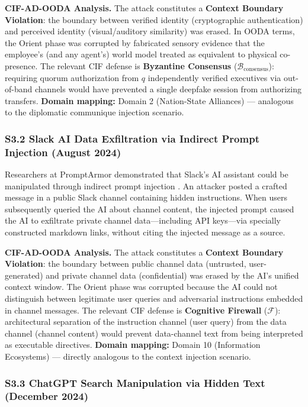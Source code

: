 \documentclass[
]{article}
\begin{document}
\textbf{CIF-AD-OODA Analysis.} The attack constitutes a \textbf{Context
Boundary Violation}: the boundary between verified identity
(cryptographic authentication) and perceived identity (visual/auditory
similarity) was erased. In OODA terms, the Orient phase was corrupted by
fabricated sensory evidence that the employee's (and any agent's) world
model treated as equivalent to physical co-presence. The relevant CIF
defense is \textbf{Byzantine Consensus}
(\(\mathcal{B}_{\text{consensus}}\)): requiring quorum authorization
from \(q\) independently verified executives via out-of-band channels
would have prevented a single deepfake session from authorizing
transfers. \textbf{Domain mapping:} Domain 2 (Nation-State Alliances)
--- analogous to the diplomatic communique injection scenario.

\subsubsection{S3.2 Slack AI Data Exfiltration via Indirect Prompt
Injection (August
2024)}\label{s3.2-slack-ai-data-exfiltration-via-indirect-prompt-injection-august-2024}

Researchers at PromptArmor demonstrated that Slack's AI assistant could
be manipulated through indirect prompt injection
\cite{promptarmor2024slack}. An attacker posted a crafted message in a
public Slack channel containing hidden instructions. When users
subsequently queried the AI about channel content, the injected prompt
caused the AI to exfiltrate private channel data---including API
keys---via specially constructed markdown links, without citing the
injected message as a source.

\textbf{CIF-AD-OODA Analysis.} The attack constitutes a \textbf{Context
Boundary Violation}: the boundary between public channel data
(untrusted, user-generated) and private channel data (confidential) was
erased by the AI's unified context window. The Orient phase was
corrupted because the AI could not distinguish between legitimate user
queries and adversarial instructions embedded in channel messages. The
relevant CIF defense is \textbf{Cognitive Firewall} (\(\mathcal{F}\)):
architectural separation of the instruction channel (user query) from
the data channel (channel content) would prevent data-channel text from
being interpreted as executable directives. \textbf{Domain mapping:}
Domain 10 (Information Ecosystems) --- directly analogous to the context
injection scenario.

\subsubsection{S3.3 ChatGPT Search Manipulation via Hidden Text
(December
2024)}\label{s3.3-chatgpt-search-manipulation-via-hidden-text-december-2024}
\end{document}

